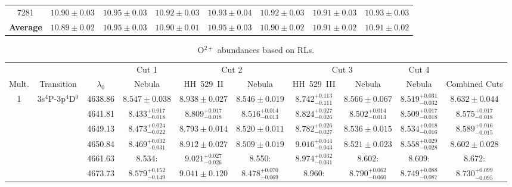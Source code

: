 \documentclass[fleqn,usenatbib]{mnras}
\begin{document}
\begin{table*}
\begin{tabular}{cccccccc}
7281 & $10.90\pm 0.03$ & $10.95 \pm 0.03$ & $10.92\pm 0.03$ & $10.93 \pm 0.04$  & $10.92 \pm 0.03$ & $10.91 \pm 0.03$ & $10.93 \pm 0.03$  \\

\textbf{Average} & \boldmath$10.89 \pm 0.02$ &\boldmath$10.95\pm 0.03$&\boldmath$10.90 \pm 0.01$&\boldmath$10.95 \pm 0.03 $&\boldmath$10.90 \pm 0.02$&\boldmath$10.91 \pm 0.02$&\boldmath$10.91 \pm 0.02$ \\

\hline
\end{tabular}
\end{table*}




\begin{sidewaystable*}
\centering
\caption{O$^{2+}$ abundances based on RLs.}
\label{tab:OII_abundances}
\begin{tabular}{cccccccccc}
\hline
 & & & \multicolumn{1}{c}{Cut 1} & \multicolumn{2}{c}{Cut 2} &  \multicolumn{2}{c}{Cut 3} & \multicolumn{1}{c}{Cut 4}&\\
Mult.& Transition& $\lambda_0$ &  Nebula & HH~529~II &  Nebula & HH~529~III &  Nebula &  Nebula & Combined Cuts \\
\hline
1& 3s$^{4}$P-3p$^{4}$D$^{0}$  &4638.86 & $8.547 \pm 0.038$  & $8.938 \pm 0.027$  & $8.546 \pm 0.019$ &  $8.742^{+0.113} _{-0.111}$  & $8.566 \pm 0.067$ & $8.519^{+0.031} _{-0.032}$ & $8.632 \pm 0.044$ \\
&&4641.81 & $8.433^{+0.017} _{-0.018}$ & $8.809^{+0.017} _{-0.018}$  & $8.516^{+0.014} _{-0.013}$ &  $8.824^{+0.027} _{-0.026}$  & $8.502^{+0.014} _{-0.013}$ & $8.509^{+0.017} _{-0.018}$ & $8.575^{+0.017} _{-0.018}$   \\
&&4649.13 & $8.473^{+0.024} _{-0.022}$ & $8.793 \pm 0.014 $ & $8.520 \pm 0.011$ & $8.782^{+0.026} _{-0.027}$ & $8.536 \pm 0.015$ & $8.534^{+0.018} _{-0.016}$ & $8.589^{+0.016} _{-0.015}$   \\
&&4650.84 & $8.469^{+0.032} _{-0.031}$ & $8.912 \pm 0.027 $ & $8.509 \pm 0.019$ & $9.016^{+0.044} _{-0.043}$ & $8.521 \pm 0.023$ & $8.558^{+0.029} _{-0.028}$ & $8.602 \pm 0.028$   \\
&&4661.63 & 8.534: &  $9.021^{+0.027} _{-0.026}$ & 8.550: & $8.974^{+0.032} _{-0.031}$ & 8.602: & 8.609:  & 8.672:  \\
&&4673.73 & $8.579^{+0.152} _{-0.149}$ & $9.041 \pm 0.120 $ & $8.478^{+0.070} _{-0.069}$ & 8.960: & $8.790^{+0.062} _{-0.060}$ & $8.749^{+0.088} _{-0.087}$ & $8.730^{+0.099} _{-0.095}$   \\

\end{tabular}
\end{sidewaystable*}
\end{document}
